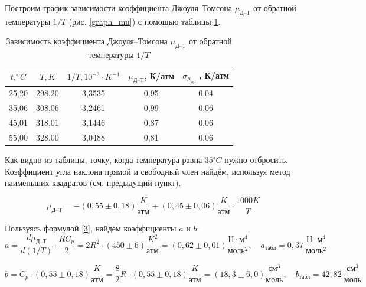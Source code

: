 \documentclass[a4paper, 12pt]{article}
\begin{document}
    \noindent Построим график зависимости коэффициента Джоуля–Томсона $\mu_\text{Д--Т}$ от обратной температуры $1/T$ (рис. \ref{graph_mu}) с помощью таблицы \ref{tab:ab}.

    \begin{table}[H]
        \centering
        \begin{tabular}{|c|c|c|c|c|}
            \hline
            $t, ^\circ C$ & $T, K$ & $1/T, 10^{-3} \cdot K^{-1}$ & $\mu_\text{Д--Т}$, К/атм & $\sigma_{\mu_\text{Д--Т}}$, К/атм \\ \hline
            25,20 & 298,20 & 3,3535 & 0,95 & 0,04 \\ \hline
            35,06 & 308,06 & 3,2461 & 0,99 & 0,06 \\ \hline
            45,01 & 318,01 & 3,1446 & 0,87 & 0,06 \\ \hline
            55,00 & 328,00 & 3,0488 & 0,81 & 0,06 \\ \hline
        \end{tabular}
        \caption{Зависимость коэффициента Джоуля–Томсона $\mu_\text{Д--Т}$ от обратной температуры $1/T$}
        \label{tab:ab}
    \end{table}

    \noindent Как видно из таблицы, точку, когда температура равна $35 ^\circ C$ нужно отбросить. Коэффициент угла наклона прямой и свободный член найдём, используя метод наименьших квадратов (см. предыдущий пункт).

    $$
    \boxed{\mu_{\text{Д--Т}} = -\left( 0,55 \pm 0,18 \right) \frac{K}{\text{атм}} + \left( 0,45 \pm 0,06 \right) \frac{K}{\text{атм}} \cdot \frac{1000 K}{T}}
    $$

    \noindent Пользуясь формулой \ref{3}, найдём коэффициенты $a$ и $b$:
    \begin{equation}
        \label{eq:a}
        a = \frac{d\mu_\text{Д--Т}}{d(1/T)} \cdot \frac{RC_{p}}{2} = 2R^2 \cdot \left( 450 \pm 6 \right) \frac{K^2}{\text{атм}} = \left( 0,62 \pm 0,01 \right) \frac{\text{Н} \cdot {\text{м}}^4}{{\text{моль}}^2}, \quad a_{\text{табл}} = 0,37 \: \frac{\text{Н} \cdot {\text{м}}^4}{{\text{моль}}^2}
    \end{equation}

    \begin{equation}
        \label{eq:b}
        b = C_p \cdot \left( 0,55 \pm 0,18 \right) \frac{K}{\text{атм}} = \frac{8}{2} R \cdot \left( 0,55 \pm 0,18 \right) \frac{K}{\text{атм}} = \left( 18,3 \pm 6,0 \right) \frac{{\text{см}}^3}{\text{моль}}, \quad b_{\text{табл}} = 42,82 \: \frac{{\text{см}}^3}{\text{моль}}
    \end{equation}
\end{document}
